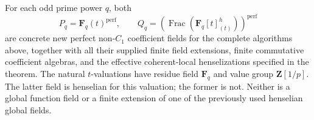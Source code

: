 \begin{corollary}
\label{C:perfect-global-nonC1-family}
For each odd prime power $q$, both
\[
 P_q=\mathbf F_q(t)^{\mathrm{perf}},\qquad
 Q_q=\left(\operatorname{Frac}
                  (\mathbf F_q[t]_{(t)}^h)\right)^{\mathrm{perf}}
                                                               \tag{C.3.PERF8}
\]
are concrete new perfect non-$C_1$ coefficient fields for the
complete algorithms above, together with all their supplied finite
field extensions, finite commutative coefficient algebras, and the
effective coherent-local henselizations specified in the theorem.
The natural $t$-valuations have residue field $\mathbf F_q$ and
value group $\mathbf Z[1/p]$.  The latter field is henselian for
this valuation; the former is not.  Neither is a global function
field or a finite extension of one of the previously used henselian
global fields.
\end{corollary}
